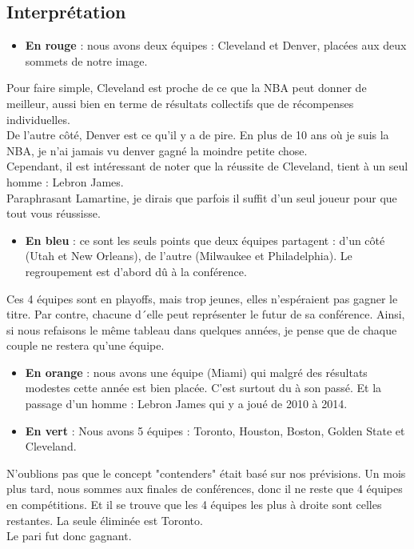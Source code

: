 \documentclass[a4paper,11pt]{article}
\begin{document}
\subsection{Interprétation}
\label{sec-3-1}

\begin{itemize}
\item \textbf{En rouge} : nous avons deux équipes : Cleveland et Denver, placées aux deux sommets de notre image. \\
\end{itemize}

Pour faire simple, Cleveland est proche de ce que la NBA peut donner de meilleur, aussi bien en terme de résultats collectifs que de récompenses individuelles. \\

De l'autre côté, Denver est ce qu'il y a de pire. En plus de 10 ans où je suis la NBA, je n'ai jamais vu denver gagné la moindre petite chose. \\

Cependant, il est intéressant de noter que la réussite de Cleveland, tient à un seul homme : Lebron James. \\

Paraphrasant Lamartine, je dirais que parfois il suffit d'un seul joueur pour que tout vous réussisse. \\

\begin{itemize}
\item \textbf{En bleu} : ce sont les seuls points que deux équipes partagent : d'un côté (Utah et New Orleans), de l'autre (Milwaukee et Philadelphia). Le regroupement est d'abord dû à la conférence. \\
\end{itemize}

Ces 4 équipes sont en playoffs, mais trop jeunes, elles n'espéraient pas gagner le titre. Par contre, chacune d´elle peut représenter le futur de sa conférence. Ainsi, si nous refaisons le même tableau dans quelques années, je pense que de chaque couple ne restera qu'une équipe. \\

\begin{itemize}
\item \textbf{En orange} : nous avons une équipe (Miami) qui malgré des résultats modestes cette année est bien placée. C'est surtout du à son passé. Et la passage d'un homme : Lebron James qui y a joué de 2010 à 2014. \\

\item \textbf{En vert} : Nous avons 5 équipes : Toronto, Houston, Boston, Golden State et Cleveland. \\
\end{itemize}

N'oublions pas que le concept "contenders" était basé sur nos prévisions. Un mois plus tard, nous sommes aux finales de conférences, donc il ne reste que 4 équipes en compétitions. Et il se trouve que les 4 équipes les plus à droite sont celles restantes. La seule éliminée est Toronto. \\

Le pari fut donc gagnant. \\
\end{document}
